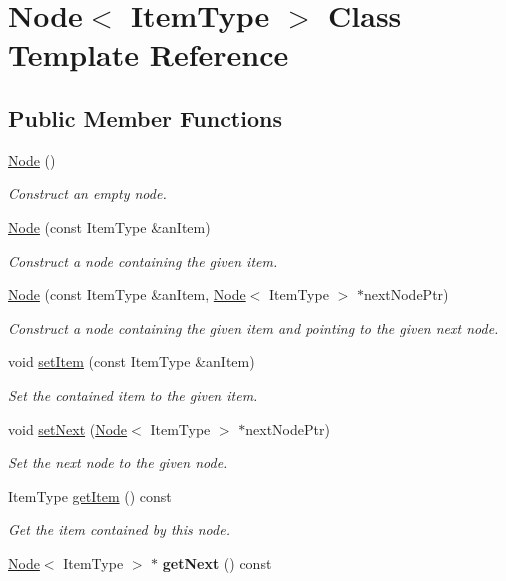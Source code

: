\hypertarget{class_node}{\section{Node$<$ Item\-Type $>$ Class Template Reference}
\label{class_node}
}
\subsection*{Public Member Functions}
\begin{DoxyCompactItemize}
\item 
\hypertarget{class_node_a627e94f4fba0e73c546e0fb2a7266f36}{\hyperlink{class_node_a627e94f4fba0e73c546e0fb2a7266f36}{Node} ()}\label{class_node_a627e94f4fba0e73c546e0fb2a7266f36}

\begin{DoxyCompactList}\small\item\em Construct an empty node. \end{DoxyCompactList}\item 
\hyperlink{class_node_a0288598fcb0244739ce95099c26250ae}{Node} (const Item\-Type \&an\-Item)
\begin{DoxyCompactList}\small\item\em Construct a node containing the given item. \end{DoxyCompactList}\item 
\hyperlink{class_node_adf98d3f9b7227622cb5a0fdd7e8f0b18}{Node} (const Item\-Type \&an\-Item, \hyperlink{class_node}{Node}$<$ Item\-Type $>$ $\ast$next\-Node\-Ptr)
\begin{DoxyCompactList}\small\item\em Construct a node containing the given item and pointing to the given next node. \end{DoxyCompactList}\item 
void \hyperlink{class_node_ab4ceecdecc5df799011de486b9f54974}{set\-Item} (const Item\-Type \&an\-Item)
\begin{DoxyCompactList}\small\item\em Set the contained item to the given item. \end{DoxyCompactList}\item 
void \hyperlink{class_node_a01c1a66d4e39f5b149e090413deb4633}{set\-Next} (\hyperlink{class_node}{Node}$<$ Item\-Type $>$ $\ast$next\-Node\-Ptr)
\begin{DoxyCompactList}\small\item\em Set the next node to the given node. \end{DoxyCompactList}\item 
Item\-Type \hyperlink{class_node_a4e5519463291a0c1570014f4ee5ca130}{get\-Item} () const 
\begin{DoxyCompactList}\small\item\em Get the item contained by this node. \end{DoxyCompactList}\item 
\hypertarget{class_node_a44fbda8e8d17a37e8203434c2909ea07}{\hyperlink{class_node}{Node}$<$ Item\-Type $>$ $\ast$ {\bfseries get\-Next} () const }\label{class_node_a44fbda8e8d17a37e8203434c2909ea07}


\end{DoxyCompactItemize}
